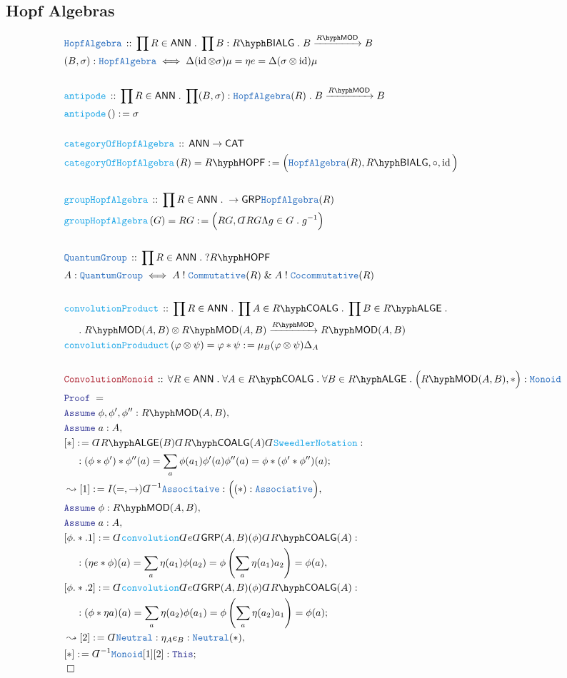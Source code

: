 \documentclass[12pt]{scrartcl}%
\newcommand{\TYPE}[1]{\textcolor{NavyBlue}{\mathtt{#1}}}%
\newcommand{\FUNC}[1]{\textcolor{Cerulean}{\mathtt{#1}}}%
\newcommand{\LOGIC}[1]{\textcolor{Blue}{\mathtt{#1}}}%
\newcommand{\THM}[1]{\textcolor{Maroon}{\mathtt{#1}}}%
\renewcommand{\.}{\; . \;} %
\newcommand{\de}{: \kern 0.1pc =} %
\newcommand{\IsNot}{\; ! \;} %
\newcommand{\Act}[1]{\left( #1 \right)} %
\newcommand{\Theorem}[2]{& \THM{#1} \, :: \, #2 \\ & \Proof = \\ } %
\newcommand{\DeclareType}[2]{& \TYPE{#1} \, :: \, #2 \\}%
\newcommand{\DefineType}[3]{& #1 : \TYPE{#2} \iff #3 \\}%
\newcommand{\DeclareFunc}[2]{& \FUNC{#1} \, :: \, #2 \\}%
\newcommand{\DefineFunc}[3]{&  \FUNC{#1}\Act{#2} \de #3 \\}%
\newcommand{\DefineNamedFunc}[4]{&  \FUNC{#1}\Act{#2} = #3 \de #4 \\}%
\newcommand{\NewLine}{\\ & \kern 1pc}%
\newcommand{\Page}[1]{ \begin{align*} #1 \end{align*}  }%
\newcommand{ \bd }{ \ByDef }%
\renewcommand{\And}{\; \& \;}%
\DeclareMathOperator*{\id}{id}%
\newcommand{\Say}[3]{& #1 \de #2 : #3, \\} %
\newcommand{\Conclude}[3]{& #1 \de #2 : #3; \\}%
\newcommand{\Derive}[3]{& \leadsto #1 \de #2 : #3, \\} %
\newcommand{\Assume}[2]{& \LOGIC{Assume} \; #1 : #2, \\} %
\newcommand{\QED}{\; \square} %
\newcommand{\EndProof}{& \QED \\} %
\newcommand{\ByDef}{\rotatebox[origin=c]{-180}{$D$}}%
\newcommand{\Proof}{\LOGIC{Proof} \; } %
\newcommand{\Arrow}[1]{\xrightarrow{#1}}%
\newcommand{\CAT}{\mathsf{CAT}} %
\newcommand{\GRP}{\mathsf{GRP}} %
\newcommand{\LMOD}[1]{#1\hyph\mathsf{MOD}} %
\newcommand{\ANN}{\mathsf{ANN}} %
\newcommand{\LALGE}[1]{#1\hyph\mathsf{ALGE}}%
\newcommand{\COALG}[1]{#1\hyph\mathsf{COALG}}%
\newcommand{\BIALG}[1]{#1\hyph\mathsf{BIALG}}%
\newcommand{\HOPF}[1]{#1\hyph\mathsf{HOPF}}%
\begin{document}
\subsection{Hopf Algebras}
\Page{
	\DeclareType{HopfAlgebra}{\prod R \in \ANN \. \prod B : \BIALG{R} \. B \Arrow{\LMOD{R}} B}
	\DefineType{(B,\sigma)}{HopfAlgebra}
	{
		\Delta(\id \otimes \sigma)\mu = \eta e = \Delta(\sigma \otimes \id)\mu
	}
	\\
	\DeclareFunc{antipode}{\prod R \in \ANN \. \prod (B,\sigma) : \TYPE{HopfAlgebra}(R) \. B \Arrow{\LMOD{R}} B }
	\DefineFunc{antipode}{}{\sigma}
	\\
	\DeclareFunc{categoryOfHopfAlgebra}
	{
		\ANN \to \CAT
	}
	\DefineNamedFunc{categoryOfHopfAlgebra}
	{R}{\HOPF{R}}{\Big(\TYPE{HopfAlgebra}(R),\BIALG{R}, \circ, \id  \Big)}
	\\
	\DeclareFunc{groupHopfAlgebra}
	{
		\prod R \in \ANN \.
		\to  \GRP 
		\TYPE{HopfAlgebra}(R)
	}
	\DefineNamedFunc{groupHopfAlgebra}{ G }
	{ RG }{ \Big( RG, \bd RG \Lambda g \in G \. g^{-1} \Big) }
	\\
	\DeclareType{QuantumGroup}{\prod R \in \ANN \. ?\HOPF{R}}
	\DefineType{ A}{QuantumGroup}{A \IsNot \TYPE{Commutative}(R) \And A \IsNot \TYPE{Cocommutative}(R)}
	\\
	\DeclareFunc{convolutionProduct}{
		\prod R \in \ANN \. 
		\prod A \in \COALG{R} \.
		\prod B \in \LALGE{R} \.
		\NewLine \. 
		\LMOD{R}(A,B) \otimes \LMOD{R}(A,B) 
		\Arrow{\LMOD{R}} \LMOD{R}(A,B)
	}
	\DefineNamedFunc{convolutionProduduct}{\varphi \otimes \psi}{\varphi * \psi}
	{ \mu_B (\varphi \otimes \psi)\Delta_A  }
	\\
	\Theorem{ConvolutionMonoid}{
		\forall R \in \ANN \.
		\forall A \in \COALG{R} \.
		\forall B \in \LALGE{R} \.
		\Big( \LMOD{R}(A,B), * \Big) : \TYPE{Monoid}
	}
	\Assume{\phi,\phi',\phi''}{\LMOD{R}(A,B)}
	\Assume{a}{A}
	\Conclude{[*]}{ \bd \LALGE{R}(B) \bd \COALG{R}(A) \bd \FUNC{SweedlerNotation}  }{
		\NewLine :
		(\phi * \phi') *\phi''(a) =
		\sum_{a} \phi(a_1)\phi'(a)\phi''(a) = 
		\phi * (\phi' * \phi'')(a)
	}
	\Derive{[1]}{I(=,\to)\bd^{-1}\TYPE{Associtaive}}{\Big((*) : \TYPE{Associative}\Big)}
	\Assume{\phi}{\LMOD{R}(A,B)}
	\Assume{a}{A}
	\Say{[\phi.*.1]}{\bd \FUNC{convolution} \bd e \bd \GRP(A,B)(\phi) \bd \COALG{R}(A) }{ 
			\NewLine :
			(\eta e * \phi)(a) =  
			\sum_a \eta(a_1)\phi(a_2) = 
			\phi\left( \sum_a \eta(a_1)a_2 \right) =
			\phi(a)
		}
	\Conclude{[\phi.*.2]}{\bd \FUNC{convolution} \bd e \bd \GRP(A,B)(\phi) \bd \COALG{R}(A) }{ 
			\NewLine :
			( \phi * \eta a)(a) =  
			\sum_a \eta(a_2)\phi(a_1) = 
			\phi\left( \sum_a \eta(a_2)a_1 \right) =
			\phi(a)
		}
	\Derive{[2]}{\bd \TYPE{Neutral}}
	{ \eta_A e_B : \TYPE{Neutral}(*)  }
	\Conclude{[*]}{\bd^{-1}\TYPE{Monoid}[1][2]}
	{\LOGIC{This}}
	\EndProof
}
\end{document}
